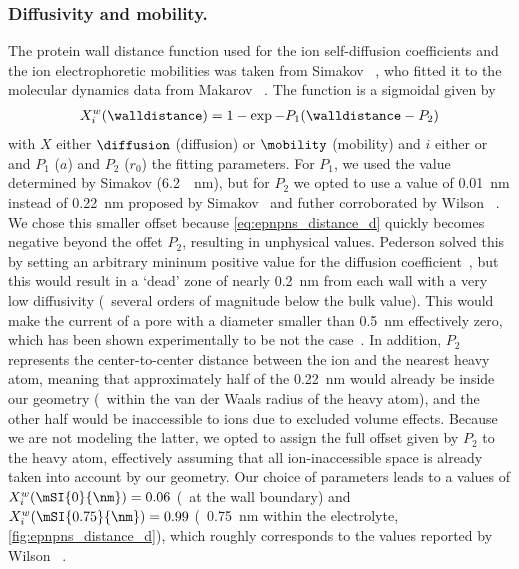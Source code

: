 \subsubsection{Diffusivity and mobility.}
%
The protein wall distance function used for the ion self-diffusion coefficients and the ion electrophoretic
mobilities was taken from Simakov \etal{}~\cite{Simakov-2010}, who fitted it to the molecular dynamics data
from Makarov \etal{}~\cite{Makarov-1998}. The function is a sigmoidal given by
%
\begin{align}\label{eq:epnpns_distance_d}
  X_{i}^w (\walldistance) = 1 - \exp{-P_1 (\walldistance - P_2)}
\end{align}
%
with $X$ either $\diffusion$ (diffusion) or $\mobility$ (mobility) and $i$ either \Na{} or \Cl{} and $P_1$
($a$) and $P_2$ ($r_0$) the fitting parameters. For $P_1$, we used the value determined by Simakov \etal{}
(\SI{6.2}{\per\nm}), but for $P_2$ we opted to use a value of \SI{0.01}{\nm} instead of \SI{0.22}{\nm}
proposed by Simakov~\cite{Simakov-2010} and futher corroborated by Wilson \etal{}~\cite{Wilson-2019}. We chose
this smaller offset because \cref{eq:epnpns_distance_d} quickly becomes negative beyond the offet $P_2$,
resulting in unphysical values. Pederson \etal{} solved this by setting an arbitrary mininum positive value
for the diffusion coefficient~\cite{Pederson-2015}, but this would result in a `dead' zone of nearly
\SI{0.2}{\nm} from each wall with a very low diffusivity (\ie~several orders of magnitude below the bulk
value). This would make the current of a pore with a diameter smaller than \SI{0.5}{\nm} effectively zero,
which has been shown experimentally to be not the case~\cite{Rigo-2019}. In addition, $P_2$ represents the
center-to-center distance between the ion and the nearest heavy atom, meaning that approximately half of the
\SI{0.22}{\nm} would already be inside our geometry (\ie~within the van der Waals radius of the heavy atom),
and the other half would be inaccessible to ions due to excluded volume effects. Because we are not modeling
the latter, we opted to assign the full offset given by $P_2$ to the heavy atom, effectively assuming that all
ion-inaccessible space is already taken into account by our geometry. Our choice of parameters leads to a
values of $X_{i}^w (\mSI{0}{\nm}) = 0.06$ (\ie~at the wall boundary) and $X_{i}^w (\mSI{0.75}{\nm}) = 0.99$
(\ie~\SI{0.75}{\nm} within the electrolyte, \cref{fig:epnpns_distance_d}), which roughly corresponds to the
values reported by Wilson \etal{}~\cite{Wilson-2019}.
%

